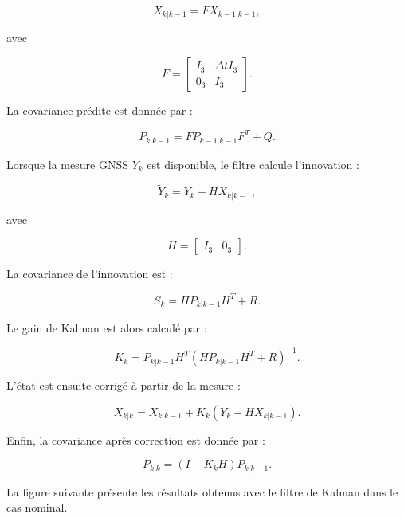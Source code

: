 \documentclass[a4paper,12pt]{article}
\begin{document}
\begin{equation}
X_{k|k-1} = F X_{k-1|k-1},
\end{equation}

avec

\begin{equation}
F =
\begin{bmatrix}
I_3 & \Delta t I_3\\
0_3 & I_3
\end{bmatrix}.
\end{equation}

La covariance prédite est donnée par :

\begin{equation}
P_{k|k-1}
=
F P_{k-1|k-1} F^T + Q.
\end{equation}

Lorsque la mesure GNSS $Y_k$ est disponible, le filtre calcule
l'innovation :

\begin{equation}
\widetilde{Y}_k
=
Y_k-HX_{k|k-1},
\end{equation}

avec

\begin{equation}
H =
\begin{bmatrix}
I_3 & 0_3
\end{bmatrix}.
\end{equation}

La covariance de l'innovation est :

\begin{equation}
S_k =
HP_{k|k-1}H^T+R.
\end{equation}

Le gain de Kalman est alors calculé par :

\begin{equation}
K_k =
P_{k|k-1}H^T
\left(
HP_{k|k-1}H^T+R
\right)^{-1}.
\end{equation}

L'état est ensuite corrigé à partir de la mesure :

\begin{equation}
X_{k|k}
=
X_{k|k-1}
+
K_k
\left(
Y_k-HX_{k|k-1}
\right).
\end{equation}

Enfin, la covariance après correction est donnée par :

\begin{equation}
P_{k|k}
=
(I-K_kH)P_{k|k-1}.
\end{equation}

La figure suivante présente les résultats obtenus avec le filtre de
Kalman dans le cas nominal.
\end{document}
